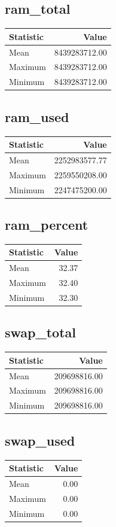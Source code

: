 \documentclass[11pt]{article}
\begin{document}
\subsection{ram_total}
\begin{tabular}{lr}
\toprule
Statistic & Value \\
\midrule
Mean & 8439283712.00 \\
Maximum & 8439283712.00 \\
Minimum & 8439283712.00 \\
\bottomrule
\end{tabular}


\subsection{ram_used}
\begin{tabular}{lr}
\toprule
Statistic & Value \\
\midrule
Mean & 2252983577.77 \\
Maximum & 2259550208.00 \\
Minimum & 2247475200.00 \\
\bottomrule
\end{tabular}


\subsection{ram_percent}
\begin{tabular}{lr}
\toprule
Statistic & Value \\
\midrule
Mean & 32.37 \\
Maximum & 32.40 \\
Minimum & 32.30 \\
\bottomrule
\end{tabular}


\subsection{swap_total}
\begin{tabular}{lr}
\toprule
Statistic & Value \\
\midrule
Mean & 209698816.00 \\
Maximum & 209698816.00 \\
Minimum & 209698816.00 \\
\bottomrule
\end{tabular}


\subsection{swap_used}
\begin{tabular}{lr}
\toprule
Statistic & Value \\
\midrule
Mean & 0.00 \\
Maximum & 0.00 \\
Minimum & 0.00 \\
\bottomrule
\end{tabular}
\end{document}
